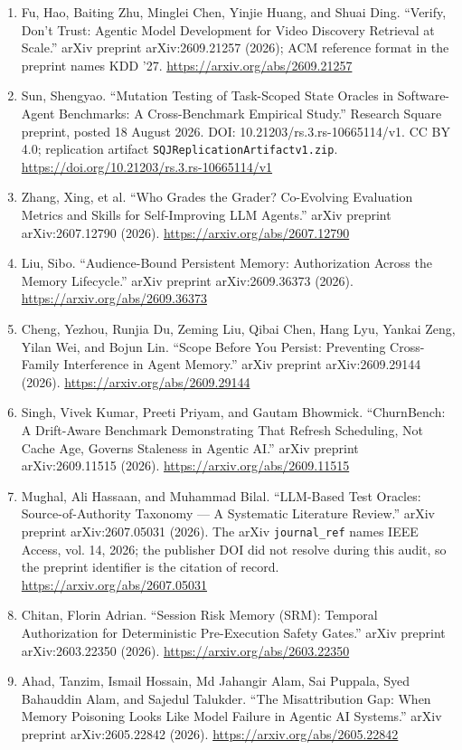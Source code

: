 \documentclass[11pt]{article}
\begin{document}
\begin{enumerate}[leftmargin=*]
\item Fu, Hao, Baiting Zhu, Minglei Chen, Yinjie Huang, and Shuai Ding. ``Verify, Don't Trust: Agentic Model Development for Video Discovery Retrieval at Scale.'' arXiv preprint arXiv:2609.21257 (2026); ACM reference format in the preprint names KDD '27. \url{https://arxiv.org/abs/2609.21257}
\item Sun, Shengyao. ``Mutation Testing of Task-Scoped State Oracles in Software-Agent Benchmarks: A Cross-Benchmark Empirical Study.'' Research Square preprint, posted 18 August 2026. DOI: 10.21203/rs.3.rs-10665114/v1. CC BY 4.0; replication artifact \texttt{SQJReplicationArtifactv1.zip}. \url{https://doi.org/10.21203/rs.3.rs-10665114/v1}
\item Zhang, Xing, et al. ``Who Grades the Grader? Co-Evolving Evaluation Metrics and Skills for Self-Improving LLM Agents.'' arXiv preprint arXiv:2607.12790 (2026). \url{https://arxiv.org/abs/2607.12790}
\item Liu, Sibo. ``Audience-Bound Persistent Memory: Authorization Across the Memory Lifecycle.'' arXiv preprint arXiv:2609.36373 (2026). \url{https://arxiv.org/abs/2609.36373}
\item Cheng, Yezhou, Runjia Du, Zeming Liu, Qibai Chen, Hang Lyu, Yankai Zeng, Yilan Wei, and Bojun Lin. ``Scope Before You Persist: Preventing Cross-Family Interference in Agent Memory.'' arXiv preprint arXiv:2609.29144 (2026). \url{https://arxiv.org/abs/2609.29144}
\item Singh, Vivek Kumar, Preeti Priyam, and Gautam Bhowmick. ``ChurnBench: A Drift-Aware Benchmark Demonstrating That Refresh Scheduling, Not Cache Age, Governs Staleness in Agentic AI.'' arXiv preprint arXiv:2609.11515 (2026). \url{https://arxiv.org/abs/2609.11515}
\item Mughal, Ali Hassaan, and Muhammad Bilal. ``LLM-Based Test Oracles: Source-of-Authority Taxonomy --- A Systematic Literature Review.'' arXiv preprint arXiv:2607.05031 (2026). The arXiv \texttt{journal\_ref} names IEEE Access, vol. 14, 2026; the publisher DOI did not resolve during this audit, so the preprint identifier is the citation of record. \url{https://arxiv.org/abs/2607.05031}
\item Chitan, Florin Adrian. ``Session Risk Memory (SRM): Temporal Authorization for Deterministic Pre-Execution Safety Gates.'' arXiv preprint arXiv:2603.22350 (2026). \url{https://arxiv.org/abs/2603.22350}
\item Ahad, Tanzim, Ismail Hossain, Md Jahangir Alam, Sai Puppala, Syed Bahauddin Alam, and Sajedul Talukder. ``The Misattribution Gap: When Memory Poisoning Looks Like Model Failure in Agentic AI Systems.'' arXiv preprint arXiv:2605.22842 (2026). \url{https://arxiv.org/abs/2605.22842}

\end{enumerate}
\end{document}
